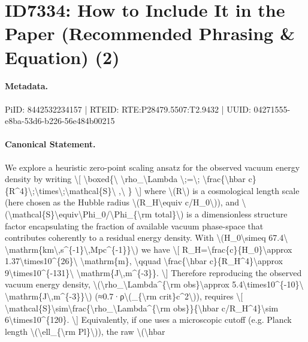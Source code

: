 \section*{ID7334: How to Include It in the Paper (Recommended Phrasing \& Equation) (2)}
\paragraph{Metadata.}
PiID: 8442532234157 | RTEID: RTE:P28479.5507:T2.9432 | UUID: 04271555-e8ba-53d6-b226-56e484b00215

\paragraph{Canonical Statement.}
We explore a heuristic zero-point scaling ansatz for the observed vacuum energy density by writing \textbackslash{}[ \textbackslash{}boxed\{\textbackslash{} \textbackslash{}rho\_\textbackslash{}Lambda \textbackslash{};=\textbackslash{}; \textbackslash{}frac\{\textbackslash{}hbar c\}\{R\textasciicircum{}4\}\textbackslash{};\textbackslash{}times\textbackslash{};\textbackslash{}mathcal\{S\}\textbackslash{} ,\textbackslash{} \} \textbackslash{}] where \textbackslash{}(R\textbackslash{}) is a cosmological length scale (here chosen as the Hubble radius \textbackslash{}(R\_H\textbackslash{}equiv c/H\_0\textbackslash{})), and \textbackslash{}(\textbackslash{}mathcal\{S\}\textbackslash{}equiv\textbackslash{}Phi\_0/\textbackslash{}Phi\_\{\textbackslash{}rm total\}\textbackslash{}) is a dimensionless structure factor encapsulating the fraction of available vacuum phase-space that contributes coherently to a residual energy density. With \textbackslash{}(H\_0\textbackslash{}simeq 67.4\textbackslash{} \textbackslash{}mathrm\{km\textbackslash{},s\textasciicircum{}\{-1\}\textbackslash{},Mpc\textasciicircum{}\{-1\}\}\textbackslash{}) we have \textbackslash{}[ R\_H=\textbackslash{}frac\{c\}\{H\_0\}\textbackslash{}approx 1.37\textbackslash{}times10\textasciicircum{}\{26\}\textbackslash{} \textbackslash{}mathrm\{m\}, \textbackslash{}qquad \textbackslash{}frac\{\textbackslash{}hbar c\}\{R\_H\textasciicircum{}4\}\textbackslash{}approx 9\textbackslash{}times10\textasciicircum{}\{-131\}\textbackslash{} \textbackslash{}mathrm\{J\textbackslash{},m\textasciicircum{}\{-3\}\}. \textbackslash{}] Therefore reproducing the observed vacuum energy density, \textbackslash{}(\textbackslash{}rho\_\textbackslash{}Lambda\textasciicircum{}\{\textbackslash{}rm obs\}\textbackslash{}approx 5.4\textbackslash{}times10\textasciicircum{}\{-10\}\textbackslash{} \textbackslash{}mathrm\{J\textbackslash{},m\textasciicircum{}\{-3\}\}\textbackslash{}) (≈0.7·ρ\textbackslash{}(\_\{\textbackslash{}rm crit\}c\textasciicircum{}2\textbackslash{})), requires \textbackslash{}[ \textbackslash{}mathcal\{S\}\textbackslash{}sim\textbackslash{}frac\{\textbackslash{}rho\_\textbackslash{}Lambda\textasciicircum{}\{\textbackslash{}rm obs\}\}\{\textbackslash{}hbar c/R\_H\textasciicircum{}4\}\textbackslash{}sim 6\textbackslash{}times10\textasciicircum{}\{120\}. \textbackslash{}] Equivalently, if one uses a microscopic cutoff (e.g. Planck length \textbackslash{}(\textbackslash{}ell\_\{\textbackslash{}rm Pl\}\textbackslash{})), the raw \textbackslash{}(\textbackslash{}hbar 
